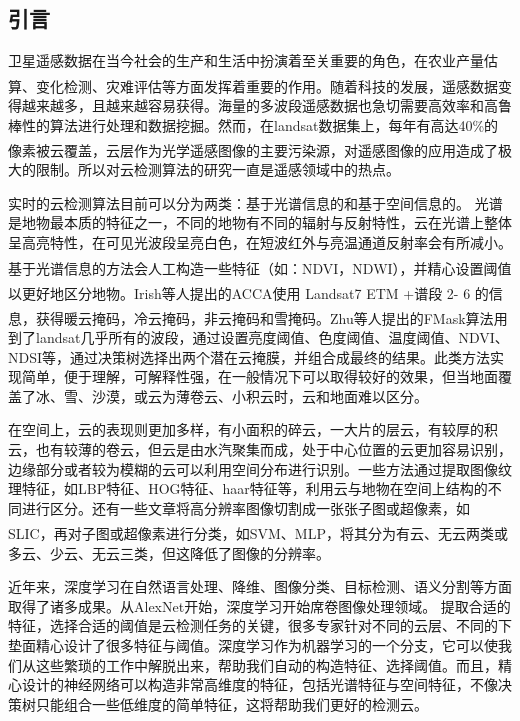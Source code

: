 \documentclass[10pt]{ctexart}
\newcommand{\upcite}[1]{\textsuperscript{\textsuperscript{\cite{#1}}}}
\begin{document}
\begin{multicols}{2} 

\setcounter{section}{-1} %
\section[]{引言}
卫星遥感数据在当今社会的生产和生活中扮演着至关重要的角色，在农业产量估算\upcite{prasad2006crop}、变化检测\upcite{verbesselt2010detecting}、灾难评估\upcite{joyce2009review}等方面发挥着重要的作用。随着科技的发展，遥感数据变得越来越多，且越来越容易获得。海量的多波段遥感数据也急切需要高效率和高鲁棒性的算法进行处理和数据挖掘。然而，在landsat数据集上，每年有高达40\%的像素被云覆盖\upcite{ju2008availability}，云层作为光学遥感图像的主要污染源，对遥感图像的应用造成了极大的限制。所以对云检测算法的研究一直是遥感领域中的热点。

实时的云检测算法目前可以分为两类：基于光谱信息的和基于空间信息的。
光谱是地物最本质的特征之一，不同的地物有不同的辐射与反射特性，云在光谱上整体呈高亮特性，在可见光波段呈亮白色，在短波红外与亮温通道反射率会有所减小。基于光谱信息的方法\upcite{sun2018cloud}会人工构造一些特征（如：NDVI，NDWI），并精心设置阈值以更好地区分地物。Irish等人\upcite{irish2006characterization}提出的ACCA使用 Landsat7 ETM +谱段 2- 6 的信息，获得暖云掩码，冷云掩码，非云掩码和雪掩码。Zhu等人提出的FMask算法\upcite{zhu2012object}用到了landsat几乎所有的波段，通过设置亮度阈值、色度阈值、温度阈值、NDVI、NDSI等，通过决策树选择出两个潜在云掩膜，并组合成最终的结果。此类方法实现简单，便于理解，可解释性强，在一般情况下可以取得较好的效果，但当地面覆盖了冰、雪、沙漠，或云为薄卷云、小积云时，云和地面难以区分。

在空间上，云的表现则更加多样，有小面积的碎云，一大片的层云，有较厚的积云，也有较薄的卷云，但云是由水汽聚集而成，处于中心位置的云更加容易识别，边缘部分或者较为模糊的云可以利用空间分布进行识别。一些方法通过提取图像纹理特征，如LBP特征、HOG特征、haar特征等，利用云与地物在空间上结构的不同进行区分。还有一些文章将高分辨率图像切割成一张张子图或超像素，如SLIC\upcite{achanta2012slic}，再对子图或超像素进行分类，如SVM\upcite{lee2004cloud}、MLP\upcite{tian1999study}，将其分为有云、无云两类或多云、少云、无云三类，但这降低了图像的分辨率。

近年来，深度学习在自然语言处理、降维、图像分类、目标检测、语义分割等方面取得了诸多成果。从AlexNet开始，深度学习开始席卷图像处理领域。
提取合适的特征，选择合适的阈值是云检测任务的关键，很多专家针对不同的云层、不同的下垫面精心设计了很多特征与阈值。深度学习作为机器学习的一个分支，它可以使我们从这些繁琐的工作中解脱出来，帮助我们自动的构造特征、选择阈值。而且，精心设计的神经网络可以构造非常高维度的特征，包括光谱特征与空间特征，不像决策树只能组合一些低维度的简单特征，这将帮助我们更好的检测云。


\end{multicols}
\end{document}
